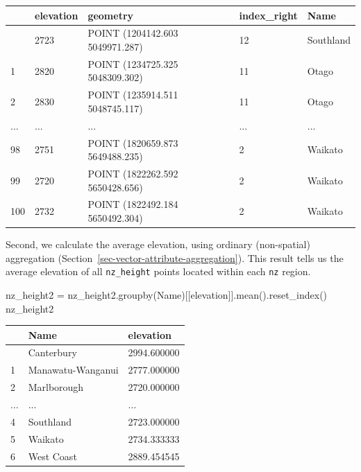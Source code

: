 \documentclass[
  letterpaper,
]{krantz}
\newenvironment{Shaded}{\begin{snugshade}}{\end{snugshade}}
\newcommand{\NormalTok}[1]{\textcolor[rgb]{0.00,0.23,0.31}{#1}}
\newcommand{\OperatorTok}[1]{\textcolor[rgb]{0.37,0.37,0.37}{#1}}
\newcommand{\StringTok}[1]{\textcolor[rgb]{0.13,0.47,0.30}{#1}}
\begin{document}
\begin{longtable}[]{@{}lllll@{}}
\toprule\noalign{}
& elevation & geometry & index\_right & Name \\
\midrule\noalign{}
\endhead
\bottomrule\noalign{}
\endlastfoot
0 & 2723 & POINT (1204142.603 5049971.287) & 12 & Southland \\
1 & 2820 & POINT (1234725.325 5048309.302) & 11 & Otago \\
2 & 2830 & POINT (1235914.511 5048745.117) & 11 & Otago \\
... & ... & ... & ... & ... \\
98 & 2751 & POINT (1820659.873 5649488.235) & 2 & Waikato \\
99 & 2720 & POINT (1822262.592 5650428.656) & 2 & Waikato \\
100 & 2732 & POINT (1822492.184 5650492.304) & 2 & Waikato \\
\end{longtable}

Second, we calculate the average elevation, using ordinary (non-spatial)
aggregation (Section~\ref{sec-vector-attribute-aggregation}). This
result tells us the average elevation of all \texttt{nz\_height} points
located within each \texttt{nz} region.

\begin{Shaded}
\begin{Highlighting}[]
\NormalTok{nz\_height2 }\OperatorTok{=}\NormalTok{ nz\_height2.groupby(}\StringTok{\textquotesingle{}Name\textquotesingle{}}\NormalTok{)[[}\StringTok{\textquotesingle{}elevation\textquotesingle{}}\NormalTok{]].mean().reset\_index()}
\NormalTok{nz\_height2}
\end{Highlighting}
\end{Shaded}

\begin{longtable}[]{@{}lll@{}}
\toprule\noalign{}
& Name & elevation \\
\midrule\noalign{}
\endhead
\bottomrule\noalign{}
\endlastfoot
0 & Canterbury & 2994.600000 \\
1 & Manawatu-Wanganui & 2777.000000 \\
2 & Marlborough & 2720.000000 \\
... & ... & ... \\
4 & Southland & 2723.000000 \\
5 & Waikato & 2734.333333 \\
6 & West Coast & 2889.454545 \\
\end{longtable}
\end{document}
